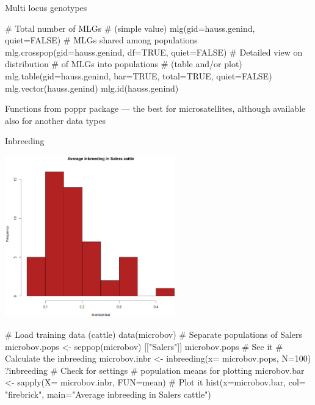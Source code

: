 \documentclass[compress, ucs, xelatex, 11pt, xcolor=svgnames, aspectratio=169,
	hyperref={
		bookmarks=true,
		unicode=true,
		colorlinks=true,
		pdftitle={Molecular data in R},
		plainpages=false,
		pdfauthor={Vojtech Zeisek},
		pdfsubject={Course about phylogeny and evolution in R},
		pdfcreator={XeLaTeX},
		pdfkeywords={R, evolution, phylogeny, molecular data},
		linkcolor=Crimson, %
		anchorcolor=Magenta, %
		citecolor=Magenta, %
		filecolor=Magenta, %
		menucolor=Magenta, %
		urlcolor=DodgerBlue, %
		pdftex},
	url={hyphens, lowtilde} %
	]{beamer}
\renewcommand{\texttt}[1]{\colorbox{Beige}{{\ttfamily #1}}}
\begin{document}
\begin{frame}[fragile]{Multi locus genotypes}
	\begin{multicols}{2}
		\texttt{[image: mlg.png]}
		\begin{spluscode}
    # Total number of MLGs
    # (simple value)
    mlg(gid=hauss.genind, quiet=FALSE)
    # MLGs shared among populations
    mlg.crosspop(gid=hauss.genind,
      df=TRUE, quiet=FALSE)
    # Detailed view on distribution
    # of MLGs into populations
    # (table and/or plot)
    mlg.table(gid=hauss.genind,
      bar=TRUE, total=TRUE,
      quiet=FALSE)
    mlg.vector(hauss.genind)
    mlg.id(hauss.genind)
		\end{spluscode}
	\end{multicols}
	Functions from poppr package --- the best for microsatellites, although available also for another data types
\end{frame}

\begin{frame}[fragile]{Inbreeding}
	\begin{multicols}{2}
		\includegraphics[height=7cm]{inbreeding.png}
		\begin{spluscode}
    # Load training data (cattle)
    data(microbov)
    # Separate populations of Salers
    microbov.pops <- seppop(microbov)
      [["Salers"]]
    microbov.pops # See it
    # Calculate the inbreeding
    microbov.inbr <- inbreeding(x=
      microbov.pops, N=100)
    ?inbreeding # Check for settings
    # population means for plotting
    microbov.bar <- sapply(X=
      microbov.inbr, FUN=mean)
    # Plot it
    hist(x=microbov.bar, col=
      "firebrick", main="Average
      inbreeding in Salers cattle")
		\end{spluscode}
	\end{multicols}
\end{frame}
\end{document}
